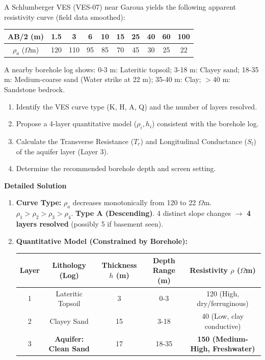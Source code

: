 \documentclass[11pt]{article}
\begin{document}
\begin{exoresolu}
A Schlumberger VES (VES-07) near Garoua yields the following apparent resistivity curve (field data smoothed):
\begin{center}
\begin{tabular}{|c|c|c|c|c|c|c|c|c|c|}
\hline
AB/2 (m) & 1.5 & 3 & 6 & 10 & 15 & 25 & 40 & 60 & 100 \\
\hline
$\rho_a$ ($\Omega$m) & 120 & 110 & 95 & 85 & 70 & 45 & 30 & 25 & 22 \\
\hline
\end{tabular}
\end{center}
A nearby borehole log shows: 0-3 m: Lateritic topsoil; 3-18 m: Clayey sand; 18-35 m: Medium-coarse sand (Water strike at 22 m); 35-40 m: Clay; $>40$ m: Sandstone bedrock.
\begin{enumerate}
    \item Identify the VES curve type (K, H, A, Q) and the number of layers resolved.
    \item Propose a 4-layer quantitative model ($\rho_i, h_i$) consistent with the borehole log.
    \item Calculate the Transverse Resistance ($T_r$) and Longitudinal Conductance ($S_l$) of the aquifer layer (Layer 3).
    \item Determine the recommended borehole depth and screen setting.
\end{enumerate}
\tcblower
\textbf{Detailed Solution}
\begin{enumerate}
    \item \textbf{Curve Type:} $\rho_a$ decreases monotonically from 120 to 22 $\Omega$m. $\rho_1 > \rho_2 > \rho_3 > \rho_4$. \textbf{Type A (Descending)}. 4 distinct slope changes $\to$ \textbf{4 layers resolved} (possibly 5 if basement seen).
    \item \textbf{Quantitative Model (Constrained by Borehole):}
    \begin{center}
    \begin{tabular}{|c|c|c|c|c|}
    \hline
    Layer & Lithology (Log) & Thickness $h$ (m) & Depth Range (m) & Resistivity $\rho$ ($\Omega$m) \\
    \hline
    1 & Lateritic Topsoil & 3 & 0-3 & 120 (High, dry/ferruginous) \\
    2 & Clayey Sand & 15 & 3-18 & 40 (Low, clay conductive) \\
    3 & \textbf{Aquifer: Clean Sand} & 17 & 18-35 & \textbf{150 (Medium-High, Freshwater)} \\

\end{tabular}
\end{center}
\end{enumerate}
\end{exoresolu}
\end{document}
